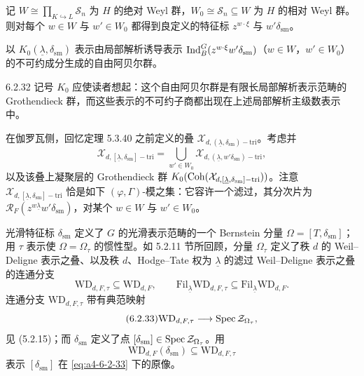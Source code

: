 记 $W\cong\prod_{K\hookrightarrow L}\mathcal S_n$ 为 $H$ 的绝对 Weyl 群，$W_0\cong\mathcal S_n\subseteq W$ 为 $H$ 的相对 Weyl 群。 则对每个 $w\in W$ 与 $w'\in W_0$ 都得到良定义的特征标 $z^{w\cdot\xi}$ 与 $w'\delta_{\mathrm{sm}}$。

以 $K_0(\underline\lambda,\delta_{\mathrm{sm}})$ 表示由局部解析诱导表示 $\operatorname{Ind}_B^G(z^{w\cdot\xi}w'\delta_{\mathrm{sm}})$（$w\in W$，$w'\in W_0$）的不可约成分生成的自由阿贝尔群。

\begin{rem}{6.2.32}\label{rem:a4-6-2-32}
记号 $K_0$ 应使读者想起：这个自由阿贝尔群是有限长局部解析表示范畴的 Grothendieck 群，而这些表示的不可约子商都出现在上述局部解析主级数表示中。
\end{rem}

在伽罗瓦侧，回忆定理 5.3.40 之前定义的叠 $\mathcal X_{d,(\underline\lambda,\delta_{\mathrm{sm}})-\mathrm{tri}}$。考虑并
\[
\mathcal X_{d,[\underline\lambda,\delta_{\mathrm{sm}}]-\mathrm{tri}}
=\bigcup_{w'\in W_0}\mathcal X_{d,(\underline\lambda,w'\delta_{\mathrm{sm}})-\mathrm{tri}},
\]
以及该叠上凝聚层的 Grothendieck 群 $K_0(\operatorname{Coh}(\mathcal X_{d,[\underline\lambda,\delta_{\mathrm{sm}}]-\mathrm{tri}}))$。注意 $\mathcal X_{d,[\underline\lambda,\delta_{\mathrm{sm}}]-\mathrm{tri}}$ 恰是如下 $(\varphi,\Gamma)$-模之集：它容许一个滤过，其分次片为 $\mathcal R_F(z^{w\underline\lambda}w'\delta_{\mathrm{sm}})$，对某个 $w\in W$ 与 $w'\in W_0$。

光滑特征标 $\delta_{\mathrm{sm}}$ 定义了 $G$ 的光滑表示范畴的一个 Bernstein 分量 $\Omega=[T,\delta_{\mathrm{sm}}]$；用 $\tau$ 表示使 $\Omega=\Omega_\tau$ 的惯性型。如 5.2.11 节所回顾，分量 $\Omega_\tau$ 定义了秩 $d$ 的 Weil--Deligne 表示之叠、以及秩 $d$、Hodge--Tate 权为 $\underline\lambda$ 的滤过 Weil--Deligne 表示之叠的连通分支
\[
\mathrm{WD}_{d,F,\tau}\subseteq\mathrm{WD}_{d,F},\qquad
\mathrm{Fil}_{\underline\lambda}\mathrm{WD}_{d,F,\tau}\subseteq
\mathrm{Fil}_{\underline\lambda}\mathrm{WD}_{d,F}.
\]
连通分支 $\mathrm{WD}_{d,F,\tau}$ 带有典范映射
\begin{equation}\tag{6.2.33}\label{eq:a4-6-2-33}
\mathrm{WD}_{d,F,\tau}\longrightarrow\operatorname{Spec}\mathcal Z_{\Omega_\tau},
\end{equation}
见 (5.2.15)；而 $\delta_{\mathrm{sm}}$ 定义了点 $[\delta_{\mathrm{sm}}]\in\operatorname{Spec}\mathcal Z_{\Omega_\tau}$。用
\[
\mathrm{WD}_{d,F}(\delta_{\mathrm{sm}})\subseteq\mathrm{WD}_{d,F,\tau}
\]
表示 $[\delta_{\mathrm{sm}}]$ 在 \eqref{eq:a4-6-2-33} 下的原像。


